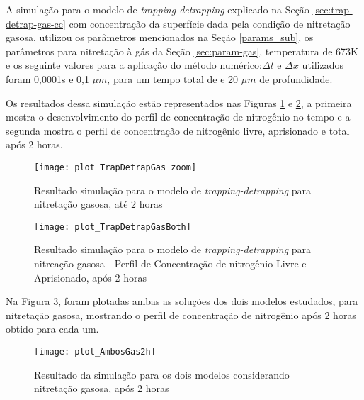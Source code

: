 \FloatBarrier
{}



A simulação para o modelo de \textit{trapping-detrapping} explicado na Seção \ref{sec:trap-detrap-gas-cc} com concentração da superfície dada pela condição de nitretação gasosa, utilizou os parâmetros mencionados na Seção \ref{params_sub}, os parâmetros para nitretação à gás da Seção \ref{sec:param-gas}, temperatura de 673K e os seguinte valores para a aplicação do método numérico:$\Delta t$ e $\Delta x$ utilizados foram 0,0001s e 0,1 $\mu m$, para um tempo total de  e 20 $\mu m$ de profundidade.

Os resultados dessa simulação estão representados nas Figuras \ref{fig:td-csvar-gas} e \ref{fig:td-csvar-gas-both}, a primeira mostra o desenvolvimento do perfil de concentração de nitrogênio no tempo e a segunda mostra o perfil de concentração de nitrogênio livre, aprisionado e total após 2 horas.

\begin{figure}[ht]
\centering
	\caption{Resultado simulação para o modelo de \textit{trapping-detrapping} para nitretação gasosa, até 2 horas}
	\texttt{[image: plot\_TrapDetrapGas\_zoom]}
	\label{fig:td-csvar-gas}
	\centering
\end{figure}


\begin{figure}[ht]
\centering
	\caption{Resultado simulação para o modelo de \textit{trapping-detrapping} para nitreação gasosa - Perfil de Concentração de nitrogênio Livre e Aprisionado, após 2 horas }
	\texttt{[image: plot\_TrapDetrapGasBoth]}
	\label{fig:td-csvar-gas-both}
	\centering
\end{figure}

Na Figura \ref{fig:td-csvar-gas-compara}, foram plotadas ambas as soluções dos dois modelos estudados, para nitretação gasosa, mostrando o perfil de concentração de nitrogênio após 2 horas obtido para cada um.

\begin{figure}[ht]
\centering
	\caption{Resultado da simulação para os dois modelos considerando nitretação gasosa, após 2 horas }
	\texttt{[image: plot\_AmbosGas2h]}
	\label{fig:td-csvar-gas-compara}
	\centering
\end{figure}
\FloatBarrier